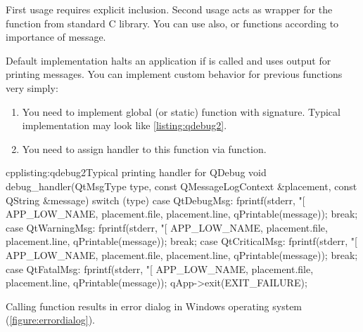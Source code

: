 First usage requires explicit inclusion. Second usage acts as wrapper for the function from standard C library. You can use also, or functions according to importance of message.

Default implementation halts an application if is called and uses output for printing messages. You can implement custom behavior for previous functions very simply:
\begin{enumerate}
\item
You need to implement global (or static) function with signature. Typical\\ implementation may look like \autoref{listing:qdebug2}.

\item
You need to assign handler to this function via function.
\end{enumerate}

\begin{fdoccode}{cpp}{listing:qdebug2}{Typical printing handler for QDebug}
void debug_handler(QtMsgType type, const QMessageLogContext &placement, const QString &message) {
    switch (type) {
	case QtDebugMsg:
	    fprintf(stderr, "[%
		    APP_LOW_NAME,
		    placement.file,
		    placement.line,
		    qPrintable(message));
	    break;
	case QtWarningMsg:
	    fprintf(stderr, "[%
		    APP_LOW_NAME,
		    placement.file,
		    placement.line,
		    qPrintable(message));
	    break;
	case QtCriticalMsg:
	    fprintf(stderr, "[%
		    APP_LOW_NAME,
		    placement.file,
		    placement.line,
		    qPrintable(message));
	    break;
	case QtFatalMsg:
	    fprintf(stderr, "[%
		    APP_LOW_NAME,
		    placement.file,
		    placement.line,
		    qPrintable(message));
	    qApp->exit(EXIT_FAILURE);
    }
}
\end{fdoccode}

Calling function results in error dialog in Windows operating system (\autoref{figure:errordialog}).

